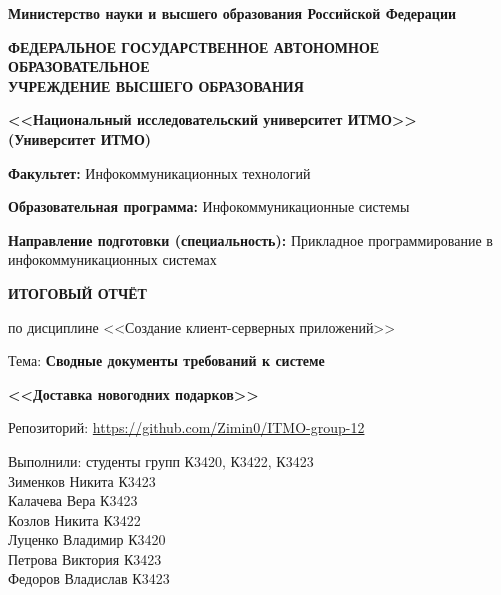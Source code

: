 \documentclass[14pt,a4paper]{extarticle}
\begin{document}
\begin{titlepage}
\thispagestyle{empty}
\begin{center}

{\bfseries Министерство науки и высшего образования Российской Федерации}

\vspace{2mm}

{\small\bfseries ФЕДЕРАЛЬНОЕ ГОСУДАРСТВЕННОЕ АВТОНОМНОЕ ОБРАЗОВАТЕЛЬНОЕ\\
УЧРЕЖДЕНИЕ ВЫСШЕГО ОБРАЗОВАНИЯ}

\vspace{2mm}

{\bfseries <<Национальный исследовательский университет ИТМО>>\\
(Университет ИТМО)}

\vspace{8mm}

\begin{flushleft}
\hspace{1.25cm}\begin{minipage}[t]{\dimexpr\textwidth-1.25cm\relax}
\textbf{Факультет:} Инфокоммуникационных технологий

\textbf{Образовательная программа:} Инфокоммуникационные системы

\textbf{Направление подготовки (специальность):} Прикладное программирование в инфокоммуникационных системах
\end{minipage}
\end{flushleft}

\vfill

{\Large\bfseries ИТОГОВЫЙ ОТЧЁТ}

\vspace{4mm}

по дисциплине <<Создание клиент-серверных приложений>>

\vspace{4mm}

Тема: \textbf{Сводные документы требований к системе}

\textbf{<<Доставка новогодних подарков>>}

\vspace{4mm}

Репозиторий: \url{https://github.com/Zimin0/ITMO-group-12}

\vfill

\end{center}

\begin{flushright}
Выполнили: студенты групп К3420, К3422, К3423\\[2mm]
Зименков Никита К3423\\
Калачева Вера К3423\\
Козлов Никита К3422\\
Луценко Владимир К3420\\
Петрова Виктория К3423\\
Федоров Владислав К3423


\end{flushright}
\end{titlepage}
\end{document}
